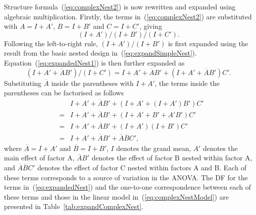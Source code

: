 \documentclass[article]{jss}
\begin{document}
Structure formula~(\ref{eq:complexNest2}) is now rewritten and expanded using algebraic multiplication. Firstly, the terms in~(\ref{eq:complexNest2}) are substituted with $A = I + A'$, $B = I + B'$ and $C = I + C'$, giving
\begin{equation}\label{eq:expandedNest1}
(I + A')/(I+ B')/(I + C').
\end{equation}
Following the left-to-right rule, $(I + A')/(I+ B')$ is first expanded using the result from the basic nested design in~(\ref{eq:expandSimpleNest}). Equation~(\ref{eq:expandedNest1}) is then further expanded as
\[
(I + A'+ \overline{A}B')/(I + C') = I + A'+ \overline{A}B' + (I + A'+ \overline{A}B')C'.
\]
Substituting $\overline{A}$ inside the parentheses with $I + A'$, the terms inside the parentheses can be factorised as follows
\begin{eqnarray}
\nonumber&&I + A'+ \overline{A}B' + (I + A'+ (I + A')B')C'\\
\nonumber&=& I + A'+ \overline{A}B' + (I + A'+ B' + A'B')C'\\
\nonumber&=& I + A'+ \overline{A}B' + (I + A')(I+ B')C'\\
\label{eq:expandedNest} &=& I + A' + \overline{A}B' + \overline{A}\overline{B}C',
\end{eqnarray}
where $\overline{A} = I + A'$ and $\overline{B} = I+ B'$, $I$ denotes the grand mean, $A'$ denotes the main effect of factor A, $\overline{A}B'$ denotes the effect of factor B nested within factor A, and $\overline{A}\overline{B}C'$ denotes the effect of factor C nested within factors A and B. Each of these terms corresponds to a source of variation in the ANOVA. The DF for the terms in~(\ref{eq:expandedNest}) and the one-to-one correspondence between each of these terms and those in the linear model in~(\ref{eq:complexNestModel}) are presented in Table~\ref{tab:expandComplexNest}.
\end{document}
